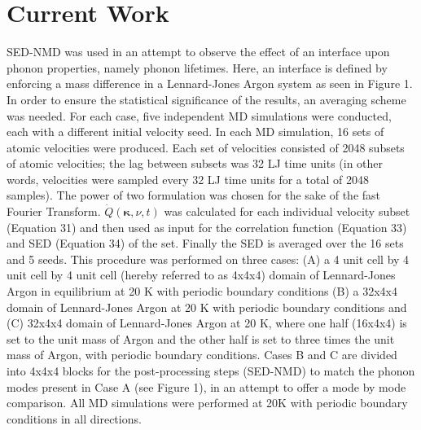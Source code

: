 \documentclass[aps,prb,preprint,preprintnumbers,amsmath,amssymb,floatfix,superscriptaddress]{revtex4}
\begin{document}
\section*{Current Work}
SED-NMD was used in an attempt to observe the effect of an interface upon phonon properties, namely phonon lifetimes. Here, an interface is defined by enforcing a mass difference in a Lennard-Jones Argon system as seen in Figure 1. In order to ensure the statistical significance of the results, an averaging scheme was needed. For each case, five independent MD simulations were conducted, each with a different initial velocity seed. In each MD simulation, 16 sets of atomic velocities were produced. Each set of velocities consisted of 2048 subsets of atomic velocities; the lag between subsets was 32 LJ time units (in other words, velocities were sampled every 32 LJ time units for a total of 2048 samples). The power of two formulation was chosen for the sake of the fast Fourier Transform. $\dot{Q}(\pmb{\kappa},\nu,t)$ was calculated for each individual velocity subset (Equation 31) and then used as input for the correlation function (Equation 33) and SED (Equation 34) of the set. Finally the SED is averaged over the 16 sets and 5 seeds. This procedure was performed on three cases: (A) a 4 unit cell by 4 unit cell by 4 unit cell (hereby referred to as 4x4x4) domain of Lennard-Jones Argon in equilibrium at 20 K with periodic boundary conditions (B) a 32x4x4 domain of Lennard-Jones Argon at 20 K with periodic boundary conditions and (C) 32x4x4 domain of Lennard-Jones Argon at 20 K, where one half (16x4x4) is set to the unit mass of Argon and the other half is set to three times the unit mass of Argon, with periodic boundary conditions. Cases B and C are divided into 4x4x4 blocks for the post-processing steps (SED-NMD) to match the phonon modes present in Case A (see Figure 1), in an attempt to offer a mode by mode comparison. All MD simulations were performed at 20K with periodic boundary conditions in all directions.
\end{document}
